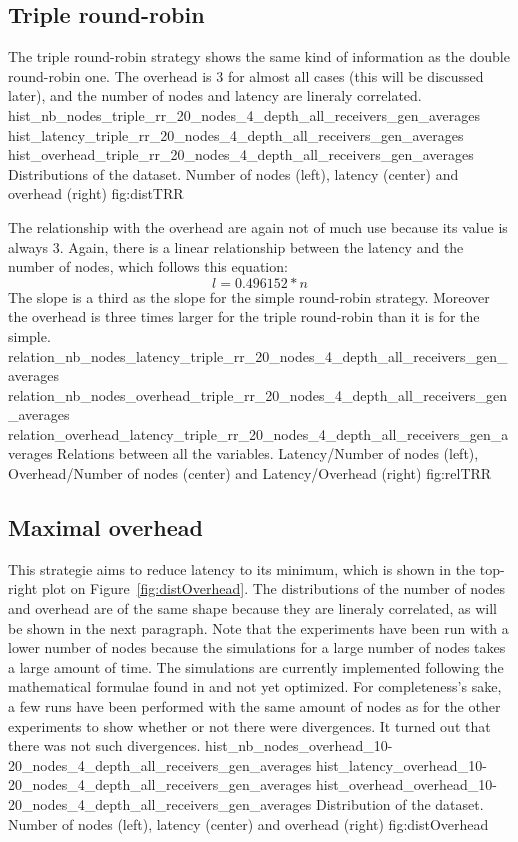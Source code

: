 \subsection{Triple round-robin}
The triple round-robin strategy shows  the same kind of information as the
double round-robin one. The overhead is 3 for almost all cases (this will be
discussed later), and the number of nodes and latency are lineraly correlated.
\triplefigure
    {hist_nb_nodes_triple_rr_20_nodes_4_depth_all_receivers_gen_averages}
    {hist_latency_triple_rr_20_nodes_4_depth_all_receivers_gen_averages}
    {hist_overhead_triple_rr_20_nodes_4_depth_all_receivers_gen_averages}
    {Distributions of the dataset. Number of nodes (left), latency (center)
    and overhead (right)}
    {fig:distTRR}

The relationship with the overhead are again not of much use because its value
is always 3. Again, there is a linear relationship between the latency and the
number of nodes, which follows this equation:
    \[l = 0.496152 * n\]
The slope is a third as the slope for the simple round-robin strategy. Moreover
the overhead is three times larger for the triple round-robin than it is for the
simple.
\triplefigure
    {relation_nb_nodes_latency_triple_rr_20_nodes_4_depth_all_receivers_gen_averages}
    {relation_nb_nodes_overhead_triple_rr_20_nodes_4_depth_all_receivers_gen_averages}
    {relation_overhead_latency_triple_rr_20_nodes_4_depth_all_receivers_gen_averages}
    {Relations between all the variables. Latency/Number of nodes (left),
    Overhead/Number of nodes (center) and Latency/Overhead (right)}
    {fig:relTRR}

\subsection{Maximal overhead}
This strategie aims to reduce latency to its minimum, which is shown in the
top-right plot on Figure~\ref{fig:distOverhead}. The distributions of the number
of nodes and overhead are of the same shape because they are lineraly
correlated, as will be shown in the next paragraph. 
Note that the experiments have been run with a lower number of nodes because the
simulations for a large number of nodes takes a large amount of time. The
simulations are currently implemented following the mathematical formulae found
in  and not yet optimized. For completeness's sake, a few runs
have been performed with the same amount of nodes as for the other experiments
to show whether or not there were divergences. It turned out that there was not
such divergences. 
\triplefigure
    {hist_nb_nodes_overhead_10-20_nodes_4_depth_all_receivers_gen_averages}
    {hist_latency_overhead_10-20_nodes_4_depth_all_receivers_gen_averages}
    {hist_overhead_overhead_10-20_nodes_4_depth_all_receivers_gen_averages}
    {Distribution of the dataset. Number of nodes (left), latency (center)
    and overhead (right)}
    {fig:distOverhead}

